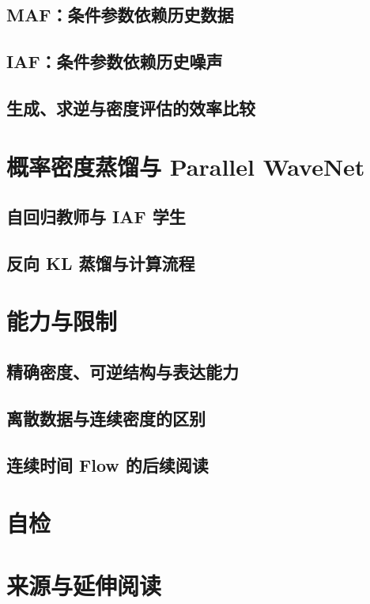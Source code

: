 \subsection{MAF：条件参数依赖历史数据}
\label{subsec:flow-maf}
\contentplaceholder

\subsection{IAF：条件参数依赖历史噪声}
\label{subsec:flow-iaf}
\contentplaceholder

\subsection{生成、求逆与密度评估的效率比较}
\label{subsec:flow-comparison}
\contentplaceholder

\section{概率密度蒸馏与 Parallel WaveNet}
\label{sec:flow-distillation}
\contentplaceholder

\subsection{自回归教师与 IAF 学生}
\label{subsec:flow-teacher-student}
\contentplaceholder

\subsection{反向 KL 蒸馏与计算流程}
\label{subsec:flow-reverse-kl}
\contentplaceholder

\section{能力与限制}
\label{sec:flow-strengths-limits}
\contentplaceholder

\subsection{精确密度、可逆结构与表达能力}
\label{subsec:flow-expressivity}
\contentplaceholder

\subsection{离散数据与连续密度的区别}
\label{subsec:flow-discrete-data}
\contentplaceholder

\subsection{连续时间 Flow 的后续阅读}
\label{subsec:flow-future}
\contentplaceholder

\section{自检}
\label{sec:flow-review}
\contentplaceholder

\section{来源与延伸阅读}
\label{sec:flow-reading}
\contentplaceholder
